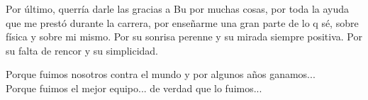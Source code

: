 Por último, querría darle las gracias a Bu por muchas cosas, por toda la ayuda que me prestó durante la carrera, por enseñarme una gran parte de lo q sé, sobre física y sobre mi mismo. Por su sonrisa perenne y su mirada siempre positiva. Por su falta de rencor y su simplicidad.

Porque fuimos nosotros contra el mundo y por algunos años ganamos...\\
Porque fuimos el mejor equipo... de verdad que lo fuimos...
